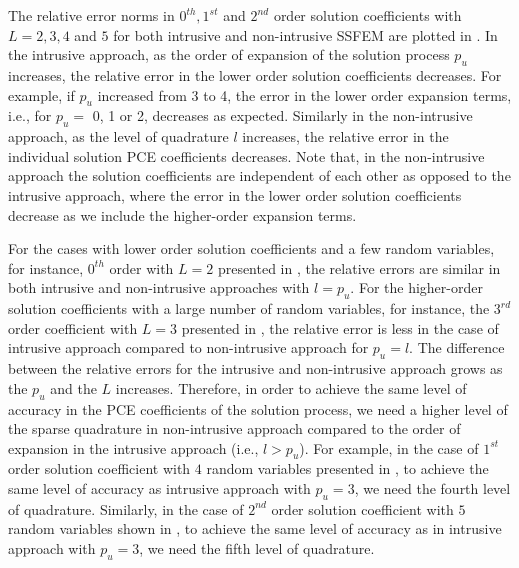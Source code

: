\documentclass[letter,1p,11pt,oneside,onecolumn,sort&compress]{elsarticle}
\begin{document}
The relative error norms in $0^{th}, 1^{st}$ and $2^{nd}$ order solution coefficients with $L=2, 3, 4$ and $5$ for both intrusive and non-intrusive SSFEM are plotted in . %
In the intrusive approach, as the order of expansion of the solution process $p_{u}$ increases, the relative error in the lower order solution coefficients decreases. For example, if $p_u$ increased from 3 to 4, the error in the lower order expansion terms, i.e., for $p_u=$ 0, 1 or 2, decreases as expected.
Similarly in the non-intrusive approach, as the level of quadrature $l$ increases, the relative error in the individual solution PCE coefficients decreases. Note that, in the non-intrusive approach the solution coefficients are independent of each other as opposed to the intrusive approach, where the error in the lower order solution coefficients decrease as we include the higher-order expansion terms.

For the cases with lower order solution coefficients and a few random variables, for instance, $0^{th}$ order with $L=2$ presented in , the relative errors are similar in both intrusive and non-intrusive approaches with $l=p_{u}$.
For the higher-order solution coefficients with a large number of random variables, for instance, the $3^{rd}$ order coefficient with $L=3$ presented in ,
the relative error is less in the case of intrusive approach compared to non-intrusive approach for $p_{u} = l$. The difference between the relative errors for the intrusive and non-intrusive approach grows as the $p_{u}$ and the $L$ increases. Therefore, in order to achieve the same level of accuracy in the PCE coefficients of the solution process, we need a higher level of the sparse quadrature in non-intrusive approach compared to the order of expansion in the intrusive approach (i.e., $l > p_{u}$).
For example, in the case of $1^{st}$ order solution coefficient with $4$ random variables presented in , to achieve the same level of accuracy as intrusive approach with $p_{u}=3$, we need the fourth level of quadrature. Similarly, in the case of $2^{nd}$ order solution coefficient with $5$ random variables shown in , to achieve the same level of accuracy as in intrusive approach with $p_{u}=3$, we need the fifth level of quadrature. %
\end{document}
